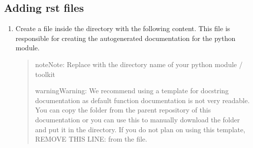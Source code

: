 \documentclass[letterpaper,10pt,english]{sphinxmanual}
\begin{document}
\subsection{Adding rst files}
\label{\detokenize{usage:adding-rst-files}}\begin{enumerate}
%
\item {} 
\sphinxAtStartPar
Create a file  inside the  directory with the following content.
This file is responsible for creating the autogenerated documentation for the python module.
\begin{quote}

%
\begin{sphinxVerbatim}[commandchars=\\\{\}]

 
     
     

\end{sphinxVerbatim}
\sphinxresetverbatimhllines

\begin{sphinxadmonition}{note}{Note:}
\sphinxAtStartPar
Replace  with the directory name of your python module / toolkit
\end{sphinxadmonition}

\begin{sphinxadmonition}{warning}{Warning:}
\sphinxAtStartPar
We recommend using a template for docstring documentation as default function documentation is not very readable.
You can copy the  folder from the parent repository of this documentation or you can use this 
to manually download the folder and put it in the  directory.
If you do not plan on using this template, REMOVE THIS LINE:  from the  file.
\end{sphinxadmonition}
\end{quote}


\end{enumerate}
\end{document}
